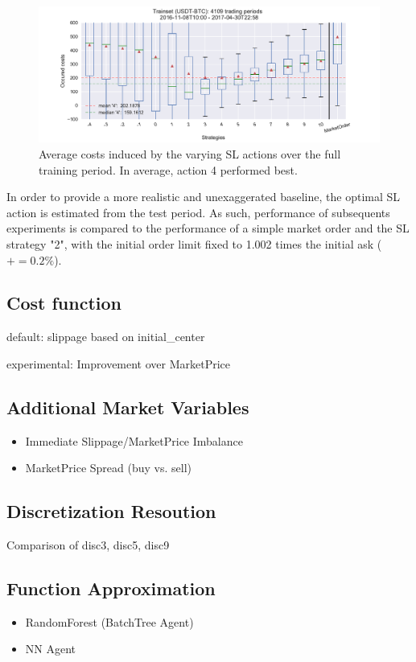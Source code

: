 \begin{figure}[ht]
        	\centering
        	\includegraphics[width=\textwidth]{content/drawings/bestActionTrain}
	\caption{Average costs induced by the varying \ac{SL} actions over the full training period. In average, action 4 performed best.}
	\label{fig:bestAction}
\end{figure}

In order to provide a more realistic and unexaggerated baseline, the optimal \ac{SL} action is estimated from the test period. As such, performance of subsequents experiments is compared to the performance of a simple market order and the \ac{SL} strategy "2", with the initial order limit fixed to 1.002 times the initial ask (\ie $+= 0.2\%$).


\subsection{Cost function}
default: slippage based on initial\_center

experimental: Improvement over MarketPrice


\subsection{Additional Market Variables}
\label{chap:exp:additionalmarketvars}
\begin{itemize}
\item Immediate Slippage/MarketPrice Imbalance
\item MarketPrice Spread (buy vs. sell)
\end{itemize}

\subsection*{Discretization Resoution}
\label{chap:experiments:discretization}
Comparison of disc3, disc5, disc9

\subsection*{Function Approximation}
\begin{itemize}
\item RandomForest (BatchTree Agent)
\item NN Agent
\end{itemize}



